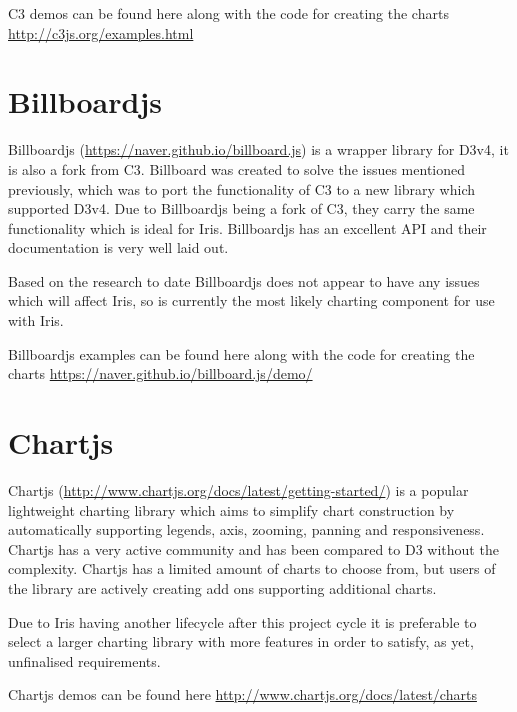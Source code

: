 \documentclass[12pt,a4paper,titlepage]{report}
\begin{document}
\begin{appendices}
C3 demos can be found here along with the code for creating the charts \url{http://c3js.org/examples.html}


\section{Billboardjs}

Billboardjs (\url{https://naver.github.io/billboard.js}) is a wrapper library for D3v4, it is also a fork from C3. Billboard was created to solve the issues mentioned previously, which was to port the functionality of C3 to a new library which supported D3v4. Due to Billboardjs being a fork of C3, they carry the same functionality which is ideal for Iris. Billboardjs has an excellent API and their documentation is very well laid out. 

Based on the research to date Billboardjs does not appear to have any issues which will affect Iris, so is currently the most likely charting component for use with Iris.

Billboardjs examples can be found here along with the code for creating the charts \url{https://naver.github.io/billboard.js/demo/}

\section{Chartjs}

Chartjs (\url{http://www.chartjs.org/docs/latest/getting-started/}) is a popular lightweight charting library which aims to simplify chart construction by automatically supporting legends, axis, zooming, panning and responsiveness. Chartjs has a very active community and has been compared to D3 without the complexity. Chartjs has a limited amount of charts to choose from, but users of the library are actively creating add ons supporting additional charts. 

Due to Iris having another lifecycle after this project cycle it is preferable to select a larger charting library with more features in order to satisfy, as yet, unfinalised  requirements.

Chartjs demos can be found here \url{http://www.chartjs.org/docs/latest/charts}
\end{appendices}
\end{document}
